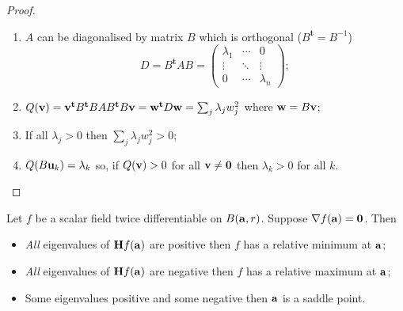 \begin{proof}
    \begin{enumerate}
        \item \(A\) can be diagonalised by  matrix \(B\)  which is orthogonal (\(B^{\mathbf{t}}=B^{-1}\))
              \[
                  D = B^{\mathbf{t}} A B =
                  \begin{pmatrix}
                      \lambda_1 & \cdots & 0         \\
                      \vdots    & \ddots & \vdots    \\
                      0         & \cdots & \lambda_n
                  \end{pmatrix};
              \]
              \vspace{-1em}
        \item \(Q(\vv) = \vv^{\mathbf{t}} B^{\mathbf{t}} B A B^{\mathbf{t}} B \vv  = \ww^{\mathbf{t}} D \ww = \sum_{j} \lambda_j w_j^2  \) where \(\ww = B \vv\);
        \item If all \(\lambda_j >0\) then \( \sum_{j} \lambda_j w_j^2  >0\);
        \item \(Q(B \uu_k ) = \lambda_k\) so, if \(Q(\vv) > 0\) for all \(\vv \neq \mathbf{0}\) then \(\lambda_k>0\) for all \(k\). \qedhere
    \end{enumerate}
\end{proof}


\begin{theorem}
    Let \(f\) be a scalar field twice differentiable on \(B(\aa,r)\).
    Suppose  \(\nabla f(\aa) = \mathbf{0}\).
    Then
    \begin{itemize}
        \item \emph{All} eigenvalues of \(\mathbf{H} f (\aa)\) are positive then \(f\) has a relative minimum at \(\aa\);
        \item \emph{All} eigenvalues of \(\mathbf{H} f (\aa)\) are negative then \(f\) has a relative maximum at \(\aa\);
        \item Some eigenvalues positive and some negative then \(\aa\) is a saddle point.
    \end{itemize}
\end{theorem}

